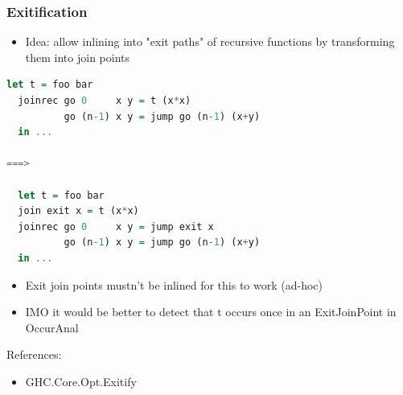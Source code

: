 \documentclass[aspectratio=169]{beamer}
\begin{document}
\begin{frame}[fragile]
  \frametitle{Exitification}

  \begin{itemize}
    \item Idea: allow inlining into "exit paths" of recursive functions by
      transforming them into join points
  \end{itemize}

\begin{lstlisting}[language=haskell,basicstyle=\tiny]
  let t = foo bar
  joinrec go 0     x y = t (x*x)
          go (n-1) x y = jump go (n-1) (x+y)
  in ...

===>

  let t = foo bar
  join exit x = t (x*x)
  joinrec go 0     x y = jump exit x
          go (n-1) x y = jump go (n-1) (x+y)
  in ...
\end{lstlisting}

  \begin{itemize}
    \item Exit join points mustn't be inlined for this to work (ad-hoc)
    \item IMO it would be better to detect that t occurs once in an ExitJoinPoint in
      OccurAnal
  \end{itemize}

  References:
  \begin{itemize}
    \item GHC.Core.Opt.Exitify
  \end{itemize}
\end{frame}
\end{document}
